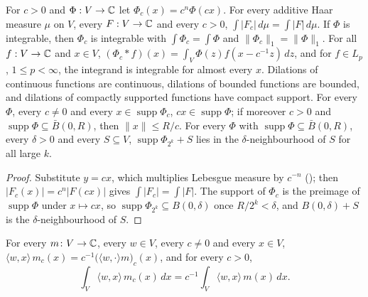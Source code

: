 \begin{lemma}[Dilations]
\label{lem:dilate}
\leanok
{}
For $c > 0$ and $\Phi : V \to \mathbb{C}$ let $\Phi_c(x) = c^n \Phi(c x)$. For every additive Haar
measure $\mu$ on $V$, every $F : V \to \mathbb{C}$ and every $c > 0$,
$\int |F_c| \, d\mu = \int |F| \, d\mu$. If $\Phi$ is integrable, then
$\Phi_c$ is integrable with $\int \Phi_c = \int \Phi$ and $\|\Phi_c\|_1 = \|\Phi\|_1$. For all
$f : V \to \mathbb{C}$ and $x \in V$, $(\Phi_c * f)(x) = \int_V \Phi(z) f(x - c^{-1} z) \, dz$, and for
$f \in L_p$, $1 \leq p < \infty$, the integrand is integrable for almost every $x$. Dilations of
continuous functions are continuous, dilations of bounded functions are bounded, and dilations
of compactly supported functions have compact support. For every $\Phi$, every $c \neq 0$ and
every $x \in \operatorname{supp} \Phi_c$, $c x \in \operatorname{supp} \Phi$; if moreover $c > 0$
and $\operatorname{supp} \Phi \subseteq \bar B(0, R)$, then $\|x\| \leq R/c$. For every $\Phi$
with $\operatorname{supp} \Phi \subseteq \bar B(0, R)$, every $\delta > 0$ and every
$S \subseteq V$, $\operatorname{supp} \Phi_{2^k} + S$ lies in the $\delta$-neighbourhood of $S$
for all large $k$.
\end{lemma}

\begin{proof}
\leanok
Substitute $y = c x$, which multiplies Lebesgue measure by $c^{-n}$
(); then $|F_c(x)| = c^n |F(c x)|$ gives $\int |F_c| = \int |F|$. The
support of $\Phi_c$ is
the preimage of $\operatorname{supp} \Phi$ under $x \mapsto c x$, so
$\operatorname{supp} \Phi_{2^k} \subseteq B(0, \delta)$ once $R / 2^k < \delta$, and
$B(0, \delta) + S$ is the $\delta$-neighbourhood of $S$.
\end{proof}

\begin{lemma}
\label{lem:first-moments-dilate}
\leanok
{}
For every $m \colon V \to \mathbb{C}$, every $w \in V$, every $c \neq 0$ and every $x \in V$,
$\langle w, x \rangle \, m_c(x) = c^{-1} \bigl(\langle w, \cdot \rangle m\bigr)_c(x)$, and for
every $c > 0$,
\[
  \int_V \langle w, x \rangle \, m_c(x) \, dx = c^{-1} \int_V \langle w, x \rangle \, m(x) \, dx .
\]
\end{lemma}

